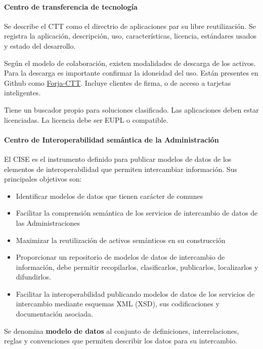         \paragraph{Centro de transferencia de tecnología} %
            Se describe el CTT como el directrio de aplicaciones par su libre reutilización. Se registra la aplicación, descripción, uso, características, licencia, estándares usados y estado del desarrollo.

            Según el modelo de colaboración, existen modalidades de descarga de los activos. Para la descarga es importante confirmar la idoneidad del uso. Están presentes en Github como \href{https://github.com/ctt-gob-es}{Forja-CTT}. Incluye clientes de firma, o de acceso a tarjetas inteligentes.

            Tiene un buscador propio para soluciones clasificado. Las aplicaciones deben estar licenciadas. La licencia debe ser EUPL o compatible.

        \paragraph{Centro de Interoperabilidad semántica de la Administración} %
            El CISE es el instrumento definido para publicar modelos de datos de los elementos de interoperabilidad que permiten intercambiar información. Sus principales objetivos son:
            \begin{itemize}
                \item Identificar modelos de datos que tienen carácter de comunes
                \item Facilitar la comprensión semántica de los servicios de intercambio de datos de las Administraciones
                \item Maximizar la reutilización de activos semánticos en su construcción
                \item Proporcionar un repositorio de modelos de datos de intercambio de información, debe permitir recopilarlos, clasificarlos, publicarlos, localizarlos y difundirlos.
                \item Facilitar la interoperabilidad publicando modelos de datos de los servicios de intercambio mediante esquemas XML (XSD), sus codificaciones y documentación asociada.
            \end{itemize}

            Se denomina \textbf{modelo de datos} al conjunto de definiciones, interrelaciones, reglas y convenciones que permiten describir los datos para su intercambio.

